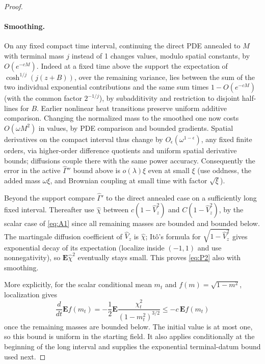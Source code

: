 \begin{proof}
\paragraph{Smoothing.} On any fixed compact time interval, continuing the direct PDE annealed to \(M\) with terminal mass \(j\) instead of 1 changes values, modulo spatial constants, by \(O(e^{-cM})\). Indeed at a fixed time above the support the expectation of \(\cosh^ {1/j}(j(z+B))\), over the remaining variance, lies between the sum of the two individual exponential contributions and the same sum times \(1-O(e^{-cM})\) (with the common factor \(2^{-1/j}\)), by subadditivity and restriction to disjoint half-lines for \(B\). Earlier nonlinear heat transitions preserve uniform additive comparison. Changing the normalized mass to the smoothed one now costs \(O(\omega M^2)\) in values, by PDE comparison and bounded gradients. Spatial derivatives on the compact interval thus change by \(O_\epsilon(\omega^{1-\epsilon})\), any fixed finite orders, via higher-order difference quotients and uniform spatial derivative bounds; diffusions couple there with the same power accuracy. Consequently the error in the active \(\widehat\Gamma''\) bound above is \(o(\lambda)\xi\) even at small \(\xi\) (use oddness, the added mass \(\omega\xi\), and Brownian coupling at small time with factor \(\sqrt{\xi}\)).

Beyond the support compare \(\widehat\Gamma'\) to the direct annealed case on a sufficiently long fixed interval. Thereafter use \(\widehat\chi\) between \(c(1-\widehat V_z^2)\) and \(C(1-\widehat V_z^2)\), by the scalar case of \eqref{eq:A1} since all remaining masses are bounded and bounded below. The martingale diffusion coefficient of \(\widehat V_z\) is \(\widehat\chi\); It\^o's formula for \(\sqrt{1-\widehat V_z^2}\) gives exponential decay of its expectation (localize inside \((-1,1)\) and use nonnegativity), so \(\mathbf E\widehat\chi^2\) eventually stays small. This proves \eqref{eq:P2} also with smoothing.

More explicitly, for the scalar conditional mean \(m_t\) and \(f(m)=\sqrt{1-m^2}\), localization gives
\[
 \frac{d}{dt}\mathbf E f(m_t)
 =-\frac12\mathbf E\frac{\chi_t^2}{(1-m_t^2)^{3/2}}
 \le -c\,\mathbf E f(m_t)
\]
once the remaining masses are bounded below. The initial value is at most one, so this bound is uniform in the starting field. It also applies conditionally at the beginning of the long interval and supplies the exponential terminal-datum bound used next.

\end{proof}

